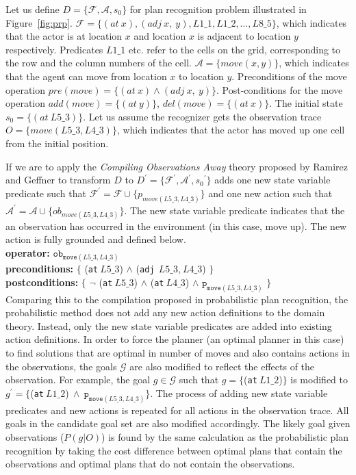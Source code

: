Let us define $D = \lbrace \mathcal{F}, \mathcal{A}, s_0 \rbrace$ for plan recognition problem illustrated in Figure~\ref{fig:prp}. $\mathcal{F}= \lbrace (at\:x), (adj\:x,\:y), L1\_1, L1\_2, \ldots, L8\_5\rbrace$, which indicates that the actor is at location $x$ and location $x$ is adjacent to location $y$ respectively. Predicates $L1\_1$ etc. refer to the cells on the grid, corresponding to the row and the column numbers of the cell. $\mathcal{A}= \lbrace move(x,y)\rbrace$, which indicates that the agent can move from location $x$ to location $y$. Preconditions of the move operation $pre(move)=\lbrace (at\:x)  \land  (adj\:x,\:y) \rbrace$. Post-conditions for the move operation $add(move)=\lbrace (at\:y) \rbrace$, $del(move)=\lbrace (at\:x) \rbrace$. The initial state $s_0=\lbrace (at\:L5\_3)\rbrace$. Let us assume the recognizer gets the observation trace $O=\lbrace move(L5\_3, L4\_3)\rbrace$, which indicates that the actor has moved up one cell from the initial position.

\sloppy
If we are to apply the \textit{Compiling Observations Away} theory proposed by Ramirez and Geffner to transform $D$ to $D^\prime=\lbrace \mathcal{F}^\prime, \mathcal{A}^\prime, {s_0}^\prime\rbrace$ adds one new state variable predicate such that $\mathcal{F}^\prime=\mathcal{F}\cup\lbrace p_{move(L5\_3, L4\_3)}\rbrace$ and one new action such that $\mathcal{A}^\prime=\mathcal{A}\cup\lbrace ob_{move(L5\_3, L4\_3)}\rbrace$. The new state variable predicate indicates that the an observation has occurred in the environment (in this case, move up). The new action is fully grounded and defined below.\\
\textbf{operator:} $\texttt{ob}_{\texttt{move}(L5\_3, L4\_3)}$\\
\textbf{preconditions:} $\lbrace$ (\texttt{at}$\:L5\_3$) $\land$  (\texttt{adj}$\:\:L5\_3$,$\:L4\_3$) $\rbrace$ \\
\textbf{postconditions:} $\lbrace$ $\neg$ (\texttt{at}$\:L5\_3$) $\land $ (\texttt{at}$\:L4\_3$) $\land$ $\texttt{p}_{\texttt{move}(L5\_3, L4\_3)}$ $\rbrace$\\
Comparing this to the compilation proposed in probabilistic plan recognition, the probabilistic method does not add any new action definitions to the domain theory. Instead, only the new state variable predicates are added into existing action definitions. In order to force the planner (an optimal planner in this case) to find solutions that are optimal in number of moves and also contains actions in the observations, the goals $\mathcal{G}$ are also modified to reflect the effects of the observation. For example, the goal $g \in \mathcal{G}$ such that $g=\lbrace$(\texttt{at}$\:L1\_2$)$\rbrace$ is modified to  $g^\prime=\lbrace$(\texttt{at}$\:L1\_2$)$ \:\land\: \texttt{p}_{\texttt{move}(L5\_3, L4\_3)}\rbrace$. The process of adding new state variable predicates and new actions is repeated for all actions in the observation trace. All goals in the candidate goal set are also modified accordingly. The likely goal given observations ($P(g|O)$) is found by the same calculation as the probabilistic plan recognition by taking the cost difference between optimal plans that contain the observations and optimal plans that do not contain the observations.


